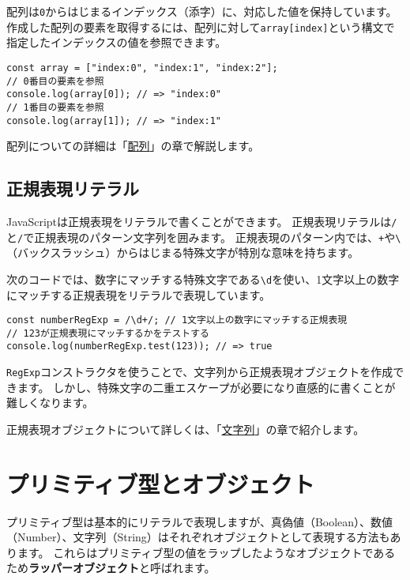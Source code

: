 配列は\texttt{0}からはじまるインデックス（添字）に、対応した値を保持しています。
作成した配列の要素を取得するには、配列に対して\texttt{array[index]}という構文で指定したインデックスの値を参照できます。

\begin{lstlisting}
const array = ["index:0", "index:1", "index:2"];
// 0番目の要素を参照
console.log(array[0]); // => "index:0"
// 1番目の要素を参照
console.log(array[1]); // => "index:1"
\end{lstlisting}

配列についての詳細は「\hyperlink{array}{配列}」の章で解説します。

\hypertarget{regexp-literal}{%
\subsection{正規表現リテラル}\label{regexp-literal}}

JavaScriptは正規表現をリテラルで書くことができます。
正規表現リテラルは\texttt{/}と\texttt{/}で正規表現のパターン文字列を囲みます。
正規表現のパターン内では、\texttt{+}や\texttt{\textbackslash}（バックスラッシュ）からはじまる特殊文字が特別な意味を持ちます。

次のコードでは、数字にマッチする特殊文字である\texttt{\textbackslash d}を使い、1文字以上の数字にマッチする正規表現をリテラルで表現しています。

\begin{lstlisting}
const numberRegExp = /\d+/; // 1文字以上の数字にマッチする正規表現
// 123が正規表現にマッチするかをテストする
console.log(numberRegExp.test(123)); // => true
\end{lstlisting}

\texttt{RegExp}コンストラクタを使うことで、文字列から正規表現オブジェクトを作成できます。
しかし、特殊文字の二重エスケープが必要になり直感的に書くことが難しくなります。

正規表現オブジェクトについて詳しくは、「\hyperlink{string}{文字列}」の章で紹介します。

\hypertarget{primitive-and-wrapper-object}{%
\section{プリミティブ型とオブジェクト}\label{primitive-and-wrapper-object}}

プリミティブ型は基本的にリテラルで表現しますが、真偽値（Boolean）、数値（Number）、文字列（String）はそれぞれオブジェクトとして表現する方法もあります。
これらはプリミティブ型の値をラップしたようなオブジェクトであるため\textbf{ラッパーオブジェクト}と呼ばれます。

